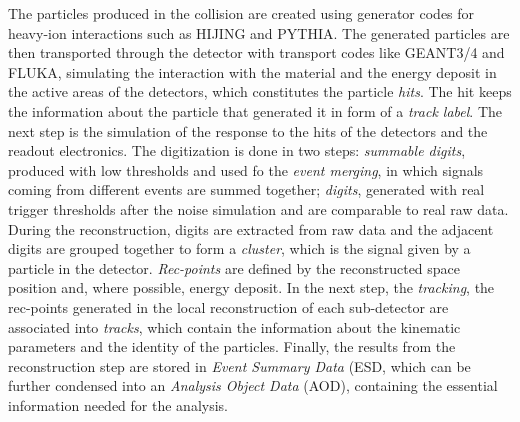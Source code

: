 The particles produced in the collision are created using generator codes for heavy-ion interactions such as HIJING and PYTHIA. The generated particles are  then transported through the detector with transport codes like GEANT3/4 and FLUKA, simulating the interaction with the material and the energy deposit in the active areas of the detectors, which constitutes the particle \textit{hits}. The hit keeps the information about the particle that generated it in form of a \textit{track label}. The next step is the simulation of the response to the hits of the detectors and the readout electronics. The digitization is done in two steps: \textit{summable digits}, produced with low thresholds and used fo the \textit{event merging}, in which signals coming from different events are summed together; \textit{digits}, generated with real trigger thresholds after the noise simulation and are comparable to real raw data.\\
During the reconstruction, digits are extracted from raw data and the adjacent digits are grouped together to form  a \textit{cluster}, which is the signal given by a particle in the detector. \textit{Rec-points} are defined by the reconstructed space position and, where possible, energy deposit. In the next step, the \textit{tracking}, the rec-points generated in the local reconstruction of each sub-detector are associated into \textit{tracks}, which contain the information about the kinematic parameters and the identity of the particles. Finally, the results from the reconstruction step are stored in \textit{Event Summary Data} (ESD, which can be further condensed into an \textit{Analysis Object Data} (AOD), containing the essential information needed for the analysis.
